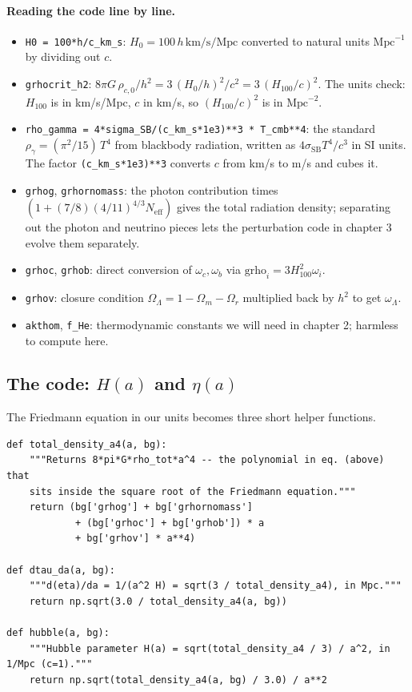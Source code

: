 \paragraph{Reading the code line by line.}
\begin{itemize}
  \item \texttt{H0 = 100*h/c\_km\_s}: $H_0 = 100\,h\,\mathrm{km/s/Mpc}$ converted to natural units $\mathrm{Mpc}^{-1}$ by dividing out $c$.
  \item \texttt{grhocrit\_h2}: $8\pi G\, \rho_{c,0}/h^2 = 3\,(H_0/h)^2/c^2 = 3\,(H_{100}/c)^2$. The units check: $H_{100}$ is in km/s/Mpc, $c$ in km/s, so $(H_{100}/c)^2$ is in $\mathrm{Mpc}^{-2}$.
  \item \texttt{rho\_gamma = 4*sigma\_SB/(c\_km\_s*1e3)**3 * T\_cmb**4}: the standard $\rho_\gamma = (\pi^2/15)\,T^4$ from blackbody radiation, written as $4\sigma_\mathrm{SB} T^4/c^3$ in SI units. The factor \texttt{(c\_km\_s*1e3)**3} converts $c$ from km/s to m/s and cubes it.
  \item \texttt{grhog}, \texttt{grhornomass}: the photon contribution times $(1 + (7/8)(4/11)^{4/3} N_\mathrm{eff})$ gives the total radiation density; separating out the photon and neutrino pieces lets the perturbation code in chapter 3 evolve them separately.
  \item \texttt{grhoc}, \texttt{grhob}: direct conversion of $\omega_c, \omega_b$ via $\mathrm{grho}_i = 3 H_{100}^2 \omega_i$.
  \item \texttt{grhov}: closure condition $\Omega_\Lambda = 1 - \Omega_m - \Omega_r$ multiplied back by $h^2$ to get $\omega_\Lambda$.
  \item \texttt{akthom}, \texttt{f\_He}: thermodynamic constants we will need in chapter 2; harmless to compute here.
\end{itemize}

\subsection{The code: $H(a)$ and $\eta(a)$}

The Friedmann equation in our units becomes three short helper functions.

\begin{codebox}
\begin{lstlisting}[style=python]
def total_density_a4(a, bg):
    """Returns 8*pi*G*rho_tot*a^4 -- the polynomial in eq. (above) that
    sits inside the square root of the Friedmann equation."""
    return (bg['grhog'] + bg['grhornomass']
            + (bg['grhoc'] + bg['grhob']) * a
            + bg['grhov'] * a**4)

def dtau_da(a, bg):
    """d(eta)/da = 1/(a^2 H) = sqrt(3 / total_density_a4), in Mpc."""
    return np.sqrt(3.0 / total_density_a4(a, bg))

def hubble(a, bg):
    """Hubble parameter H(a) = sqrt(total_density_a4 / 3) / a^2, in 1/Mpc (c=1)."""
    return np.sqrt(total_density_a4(a, bg) / 3.0) / a**2
\end{lstlisting}
\end{codebox}

